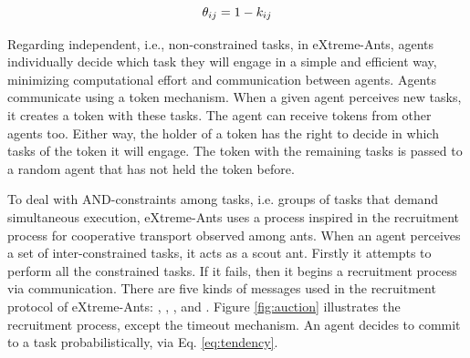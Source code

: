 \begin{equation}
\label{eq:respthresh}
\theta_{ij} = 1 - k_{ij}
\end{equation}

Regarding independent, i.e., non-constrained tasks, in eXtreme-Ants, agents individually decide which task they will engage in a simple and efficient way, minimizing computational effort and communication between agents. Agents communicate using a token mechanism. When a given agent perceives new tasks, it creates a token with these tasks. The agent can receive tokens from other agents too. Either way, the holder of a token has the right to decide in which tasks of the token it will engage. The token with the remaining tasks is passed to a random agent that has not held the token before. %

%
%

To deal with AND-constraints among tasks, i.e. groups of tasks that demand simultaneous execution, eXtreme-Ants uses a process inspired in the recruitment process for cooperative transport observed among ants. When an agent perceives a set of inter-constrained tasks, it acts as a scout ant. Firstly it attempts to perform all the constrained tasks. If it fails, then it begins a recruitment process via communication. There are five kinds of messages used in the recruitment protocol of eXtreme-Ants: , , ,  and . Figure \ref{fig:auction} illustrates the recruitment process, except the timeout mechanism. An agent decides to commit to a task probabilistically, via Eq. \ref{eq:tendency}. 

